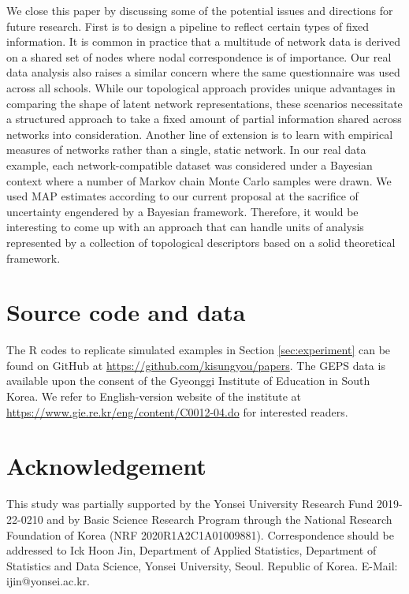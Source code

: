 \documentclass[12pt]{article}
\begin{document}
We close this paper by discussing some of the potential issues and directions for future research. First is to design a pipeline to reflect certain types of fixed information. It is common in practice that a multitude of network data is derived on a shared set of nodes where nodal correspondence is of importance. Our real data analysis also raises a similar concern where the same questionnaire was used across all schools. While our topological approach provides unique advantages in comparing the shape of latent network representations, these scenarios necessitate a structured approach to take a fixed amount of partial information shared across networks into consideration. 
Another line of extension is to learn with empirical measures of networks rather than a single, static network. In our real data example, each network-compatible dataset was considered under a Bayesian context where a number of Markov chain Monte Carlo samples were drawn. We used MAP estimates according to our current proposal at the sacrifice of uncertainty engendered by a Bayesian framework. Therefore, it would be interesting to come up with an approach that can handle units of analysis represented by a collection of topological descriptors based on a solid theoretical framework. 


\section*{Source code and data}

The \textsf{R} codes to replicate simulated examples in Section \ref{sec:experiment} can be found on GitHub at \url{https://github.com/kisungyou/papers}. The GEPS data is available upon the consent of the Gyeonggi Institute of Education in South Korea. We refer to English-version website of the institute at \url{https://www.gie.re.kr/eng/content/C0012-04.do} for interested readers. 

\section*{Acknowledgement}

This study was partially supported by the Yonsei University Research Fund 2019-22-0210 and by Basic Science Research Program through the National Research Foundation of Korea (NRF 2020R1A2C1A01009881). Correspondence should be addressed to Ick Hoon Jin, Department of Applied Statistics, Department of Statistics and Data Science, Yonsei University, Seoul. Republic of Korea. E-Mail: ijin@yonsei.ac.kr.
\end{document}
